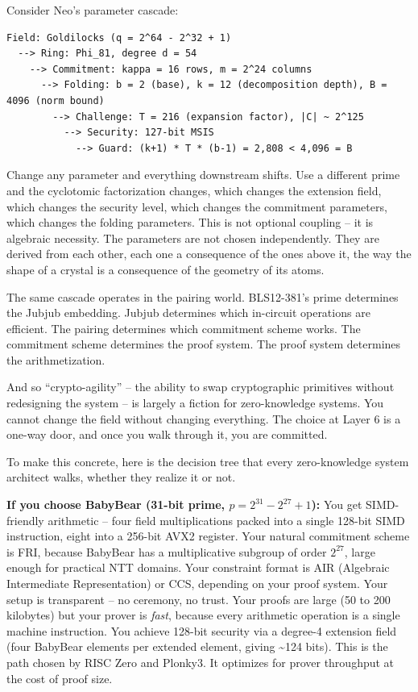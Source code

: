 \documentclass[
  11pt,
  openany]{report}
\renewcommand{\textbf}[1]{{\bfseries\color{MidnightBold}#1}}
\begin{document}
Consider Neo's parameter cascade:

\begin{verbatim}
Field: Goldilocks (q = 2^64 - 2^32 + 1)
  --> Ring: Phi_81, degree d = 54
    --> Commitment: kappa = 16 rows, m = 2^24 columns
      --> Folding: b = 2 (base), k = 12 (decomposition depth), B = 4096 (norm bound)
        --> Challenge: T = 216 (expansion factor), |C| ~ 2^125
          --> Security: 127-bit MSIS
            --> Guard: (k+1) * T * (b-1) = 2,808 < 4,096 = B
\end{verbatim}

Change any parameter and everything downstream shifts. Use a different prime and
the cyclotomic factorization changes, which changes the extension field, which
changes the security level, which changes the commitment parameters, which
changes the folding parameters. This is not optional coupling -- it is algebraic
necessity. The parameters are not chosen independently. They are derived from
each other, each one a consequence of the ones above it, the way the shape of a
crystal is a consequence of the geometry of its atoms.

The same cascade operates in the pairing world. BLS12-381's prime determines the
Jubjub embedding. Jubjub determines which in-circuit operations are efficient.
The pairing determines which commitment scheme works. The commitment scheme
determines the proof system. The proof system determines the arithmetization.

And so ``crypto-agility'' -- the ability to swap cryptographic primitives
without redesigning the system -- is largely a fiction for zero-knowledge
systems. You cannot change the field without changing everything. The choice at
Layer 6 is a one-way door, and once you walk through it, you are committed.

To make this concrete, here is the decision tree that every zero-knowledge
system architect walks, whether they realize it or not.

\textbf{If you choose BabyBear (31-bit prime, \(p = 2^{31} - 2^{27} + 1\)):} You
get SIMD-friendly arithmetic -- four field multiplications packed into a single
128-bit SIMD instruction, eight into a 256-bit AVX2 register. Your natural
commitment scheme is FRI, because BabyBear has a multiplicative subgroup of
order \(2^{27}\), large enough for practical NTT domains. Your constraint format
is AIR (Algebraic Intermediate Representation) or CCS, depending on your proof
system. Your setup is transparent -- no ceremony, no trust. Your proofs are
large (50 to 200 kilobytes) but your prover is \emph{fast}, because every
arithmetic operation is a single machine instruction. You achieve 128-bit
security via a degree-4 extension field (four BabyBear elements per extended
element, giving \textasciitilde124 bits). This is the path chosen by RISC Zero
and Plonky3. It optimizes for prover throughput at the cost of proof size.
\end{document}
